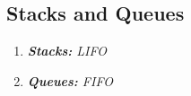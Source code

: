 \subsection{Stacks and Queues}

\begin{enumerate}
	\item \emph{\textbf{Stacks:} LIFO}
	\item \emph{\textbf{Queues:} FIFO}
\end{enumerate}